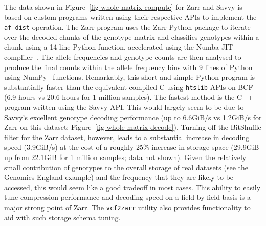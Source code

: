 \documentclass[a4paper,num-refs]{oup-contemporary}
\begin{document}
The data shown in Figure~\ref{fig-whole-matrix-compute} for Zarr and Savvy
is based on custom programs written using their respective APIs
to implement the \texttt{af-dist} operation. The Zarr program uses
the Zarr-Python package to iterate over the decoded chunks of the 
genotype matrix and classifies genotypes within a chunk using a 14 line Python
function, accelerated using the Numba JIT compliler~\cite{lam2015numba}.
The allele frequencies and genotype counts are then analysed to produce 
the final counts within the allele frequency bins with 9 lines of 
Python using NumPy~\cite{harris2020array} functions. Remarkably, this 
short and simple Python program is substantially faster than the 
equivalent compiled C using \texttt{htslib} APIs on BCF (6.9 hours
vs 20.6 hours for 1 million samples). 
The fastest method is the 
C++ program written using the Savvy API. This would largely seem
to be due to Savvy's excellent genotype decoding performance
(up to 6.6GiB/s vs 1.2GiB/s for Zarr on this dataset;
Figure~\ref{fig-whole-matrix-decode}).
Turning off the BitShuffle filter for the Zarr dataset,
however, leads to a substantial increase in decoding speed
(3.9GiB/s) at the cost of a roughly 25\% increase in storage
space (29.9GiB up from 22.1GiB for 1 million samples; data not
shown). Given the relatively small contribution of genotypes to the
overall storage of real datasets (see the Genomics England example)
and the frequency that they are likely to be accessed, this
would seem like a good tradeoff in most cases.
This ability to easily tune compression performance
and decoding speed on a field-by-field basis is a major strong
point of Zarr. The \texttt{vcf2zarr} utility also provides
functionality to aid with such storage schema tuning.
\end{document}
